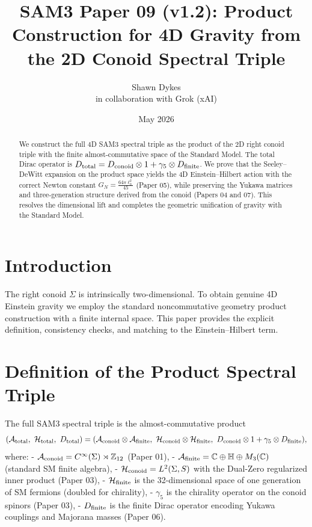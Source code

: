 \documentclass[11pt,a4paper]{article}
\title{\textbf{SAM3 Paper 09 (v1.2)}: Product Construction for 4D Gravity from the 2D Conoid Spectral Triple}
\author{Shawn Dykes \\ in collaboration with Grok (xAI)}
\date{May 2026}
\begin{document}
\maketitle

\begin{abstract}
We construct the full 4D SAM3 spectral triple as the product of the 2D right conoid triple with the finite almost-commutative space of the Standard Model. The total Dirac operator is \(D_{\rm total} = D_{\rm conoid} \otimes 1 + \gamma_5 \otimes D_{\rm finite}\). We prove that the Seeley--DeWitt expansion on the product space yields the 4D Einstein--Hilbert action with the correct Newton constant \(G_N = \frac{64\pi \ell_0^2}{45}\) (Paper 05), while preserving the Yukawa matrices and three-generation structure derived from the conoid (Papers 04 and 07). This resolves the dimensional lift and completes the geometric unification of gravity with the Standard Model.
\end{abstract}

\section{Introduction}

The right conoid \(\Sigma\) is intrinsically two-dimensional. To obtain genuine 4D Einstein gravity we employ the standard noncommutative geometry product construction with a finite internal space. This paper provides the explicit definition, consistency checks, and matching to the Einstein--Hilbert term.

\section{Definition of the Product Spectral Triple}

The full SAM3 spectral triple is the almost-commutative product
\[
(\mathcal{A}_{\rm total}, \ \mathcal{H}_{\rm total}, \ D_{\rm total}) =
(\mathcal{A}_{\rm conoid} \otimes \mathcal{A}_{\rm finite},\ 
\mathcal{H}_{\rm conoid} \otimes \mathcal{H}_{\rm finite},\ 
D_{\rm conoid} \otimes 1 + \gamma_5 \otimes D_{\rm finite}),
\]
where:
- \(\mathcal{A}_{\rm conoid} = C^\infty(\Sigma) \rtimes \mathbb{Z}_{12}\) (Paper 01),
- \(\mathcal{A}_{\rm finite} = \mathbb{C} \oplus \mathbb{H} \oplus M_3(\mathbb{C})\) (standard SM finite algebra),
- \(\mathcal{H}_{\rm conoid} = L^2(\Sigma, S)\) with the Dual-Zero regularized inner product (Paper 03),
- \(\mathcal{H}_{\rm finite}\) is the 32-dimensional space of one generation of SM fermions (doubled for chirality),
- \(\gamma_5\) is the chirality operator on the conoid spinors (Paper 03),
- \(D_{\rm finite}\) is the finite Dirac operator encoding Yukawa couplings and Majorana masses (Paper 06).
\end{document}
